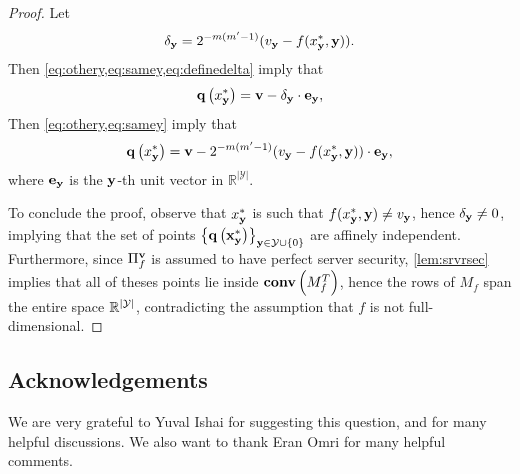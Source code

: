 \documentclass{llncs}
\newcommand{\Y}{\mathcal{Y}}
\newcommand{\CH}[1]{\normalfont{\mathbf{conv}\of{#1}}}
\renewcommand{\q}{\myvec{q}}
\renewcommand{\v}{\myvec{v}}
\newcommand{\x}{\myvec{x}}
\newcommand{\y}{\myvec{y}}
\begin{document}
\begin{proof}
\ifdefined\IsFV
Let 
\begin{align}\label{eq:definedelta}
\delta_\y=2^{-m(m'-1)}(v_\y - f(x^*_\y,\y)).
\end{align}
Then \cref{eq:othery,eq:samey,eq:definedelta} imply that
\begin{align*}
\q\of{x^*_{\y}} = 
\v - \delta_{\y}\cdot\myvec{e}_\y,
\end{align*}
\else
Then \cref{eq:othery,eq:samey} imply that
\begin{align*}
\q\of{x^*_{\y}} = 
\v - 2^{-m(m'-1)}(v_\y - f(x^*_\y,\y))\cdot\myvec{e}_\y,
\end{align*}
\fi
where $\myvec{e}_\y$ is the $\y$-th unit vector in $\mathbb{R}^{|\Y|}$.

To conclude the proof, observe that $x^*_{\y}$ is such that $f(x^*_\y,\y)\ne v_\y$, \ifdefined\IsFV hence $\delta_{\y}\ne0$, \else\fi implying that the set of points $\set{\q\of{\x^*_{\y}}}_{\y\in\Y\cup\set{0}}$ are affinely independent. Furthermore, since $\Pi_f^{\v}$ is assumed to have perfect server security, \cref{lem:srvrsec} implies that all of theses points lie inside $\CH{M_f^T}$, hence the rows of $M_f$ span the entire space $\R^{|\Y|}$, contradicting the assumption that $f$ is not full-dimensional.
\end{proof}


\subsection*{Acknowledgements}

We are very grateful to Yuval Ishai for suggesting this question, and for many helpful discussions. We also want to thank Eran Omri for many helpful comments.



\end{document}
